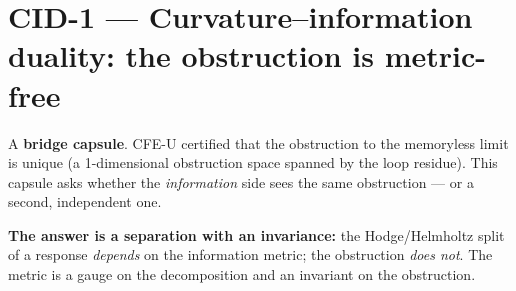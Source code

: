 \hypertarget{cid-1-curvatureinformation-duality-the-obstruction-is-metric-free}{%
\chapter{CID-1 --- Curvature--information duality: the obstruction is metric-free}\label{cid-1-curvatureinformation-duality-the-obstruction-is-metric-free}}

A \textbf{bridge capsule}. CFE-U certified that the obstruction to the
memoryless limit is unique (a 1-dimensional obstruction space spanned by
the loop residue). This capsule asks whether the \emph{information} side sees
the same obstruction --- or a second, independent one.

\textbf{The answer is a separation with an invariance:} the Hodge/Helmholtz
split of a response \emph{depends} on the information metric; the obstruction
\emph{does not}. The metric is a gauge on the decomposition and an invariant
on the obstruction.

